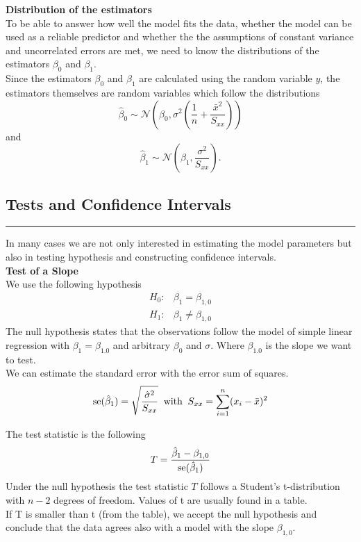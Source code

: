 \textbf{Distribution of the estimators}\\
To be able to answer how well the model fits the data, whether the model can be used as a reliable predictor and whether the the assumptions of constant variance and uncorrelated errors are met, we need to know the distributions of the estimators $\beta_0$ and $\beta_1$.\\
Since the estimators $\beta_0$ and $\beta_1$ are calculated using the random variable $y$, the estimators themselves are random variables which follow the distributions
\begin{equation}
  \hat{\beta}_0 \sim \mathcal{N}\left(\beta_0, \sigma^2\left(\frac{1}{n} + \frac{\bar{x}^2}{S_{xx}}\right)\right)
\end{equation}
and
\begin{equation}
  \hat{\beta}_1 \sim \mathcal{N}\left(\beta_1, \frac{\sigma^2}{S_{xx}}\right).
\end{equation}

\subsection{Tests and Confidence Intervals}
\noindent\rule[\linienAbstand]{\linewidth}{\linienDicke}
In many cases we are not only interested in estimating the model parameters but also in testing hypothesis and constructing confidence intervals.\\

\textbf{Test of a Slope}\\
We use the following hypothesis
\begin{equation}
  \begin{split}
    H_0:& \beta_1 = \beta_{1,0}\\
    H_1:& \beta_1 \neq \beta_{1,0}
  \end{split}
\end{equation}
The null hypothesis states that the observations follow the model of simple linear regression with $\beta_{1} = \beta_{1.0}$ and arbitrary $\beta_0$ and $\sigma$. Where $\beta_{1.0}$ is the slope we want to test.\\

We can estimate the standard error with the error sum of squares.
\begin{equation}
  \textup{se}(\hat{\beta}_1) = \sqrt{\frac{\hat{\sigma}^2}{S_{xx}}} \;\;\text{with}\;\; S_{xx} =  \sum^n_{i=1}(x_i - \bar{x})^2
\end{equation}

The test statistic is the following
\begin{equation}
  T = \frac{\hat{\beta}_1 - \beta_{1,0}}{\textup{se}(\hat{\beta}_1)}
  \label{eq:7.3.b}
\end{equation}
Under the null hypothesis the test statistic $T$ follows a Student’s t-distribution with $n - 2$ degrees of freedom. Values of t are usually found in a table.\\
If T is smaller than t (from the table), we accept the null hypothesis and conclude that the data agrees also with a model with the slope $\beta_{1,0}$.\\

